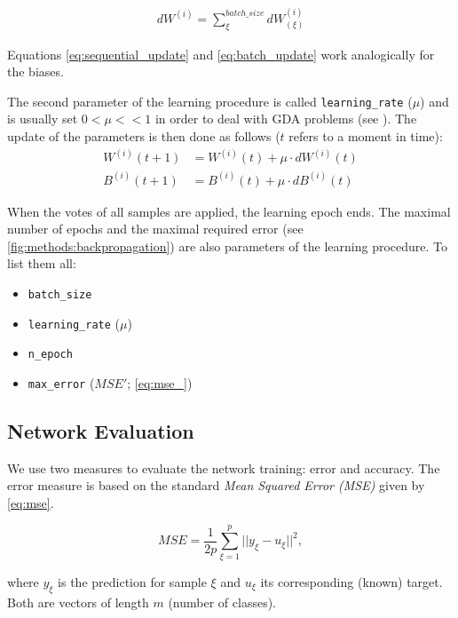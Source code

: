 \begin{enumerate}
\begin{align} \label{eq:batch_update}
dW^{(i)} = \displaystyle{\sum_{\xi}^{batch\_size} dW^{(i)}_{(\xi)}}
\end{align}

Equations \ref{eq:sequential_update} and \ref{eq:batch_update} work analogically for the biases.

The second parameter of the learning procedure is called \texttt{learning\_rate} ($ \mu $) and is usually set $ 0 < \mu << 1 $ in order to deal with GDA problems (see \citep{online:nnanddl}). The update of the parameters is then done as follows ($ t $ refers to a moment in time):
\begin{align} \label{eq:params_update}
W^{(i)} (t+1) &= W^{(i)} (t) + \mu \cdot dW^{(i)} (t) \\ 
B^{(i)} (t+1) &= B^{(i)} (t) + \mu \cdot dB^{(i)} (t)
\end{align}
\end{enumerate}

When the votes of all samples are applied, the learning epoch ends. The maximal number of epochs and the maximal required error (see \cref{fig:methods:backpropagation}) are also parameters of the learning procedure. To list them all:

\begin{itemize}
\item \texttt{batch\_size}
\item \texttt{learning\_rate} ($ \mu $)
\item \texttt{n\_epoch}
\item \texttt{max\_error} ($ MSE' $; \cref{eq:mse_})
\end{itemize}

\subsection*{Network Evaluation}
We use two measures to evaluate the network training: error and accuracy.
The error measure is based on the standard \textit{Mean Squared Error (MSE)} given by \cref{eq:mse}.

\begin{equation} \label{eq:mse}
MSE = \frac{1}{2 p} \displaystyle{\sum^{p}_{\xi=1} ||y_{\xi} - u_{\xi}||^2},
\end{equation}

where $ y_{\xi} $ is the prediction for sample $ \xi $ and $ u_{\xi} $ its corresponding (known) target. Both are vectors of length $ m $ (number of classes).

